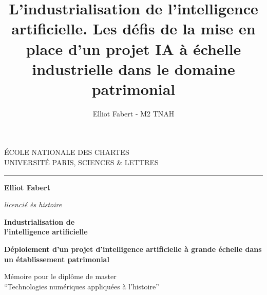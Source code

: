 \documentclass[a4paper,12pt,twoside]{book}
\author{Elliot Fabert - M2 TNAH}
\title{L'industrialisation de l'intelligence artificielle. Les défis de la mise en place d'un projet IA à échelle industrielle dans le domaine patrimonial}
\begin{document}
	\begin{titlepage}
		\begin{center}
			
			\bigskip
			
			\begin{large}				
				ÉCOLE NATIONALE DES CHARTES\\
				UNIVERSITÉ PARIS, SCIENCES \& LETTRES
			\end{large}
			\begin{center}\rule{2cm}{0.02cm}\end{center}
			
			\bigskip
			\bigskip
			\bigskip
			\begin{Large}
				\textbf{Elliot Fabert}\\
			\end{Large}
			\begin{normalsize} \textit{licencié ès histoire}\\
			\end{normalsize}
			
			\bigskip
			\bigskip
			\bigskip
			
			\begin{Huge}
				\textbf{Industrialisation de\\ l'intelligence artificielle}\\
			\end{Huge}
			\bigskip
			\bigskip
			\begin{LARGE}
				\textbf{Déploiement d’un projet d’intelligence artificielle à grande échelle dans un établissement patrimonial}\\
			\end{LARGE}
			
			\bigskip
			\bigskip
			\bigskip
			\begin{large}
			\end{large}
			\vfill
			
			\begin{large}
				Mémoire 
				pour le diplôme de master \\
				\enquote{Technologies numériques appliquées à l'histoire} \\
			\end{large}
			
		\end{center}
	\end{titlepage}

	\thispagestyle{empty}	
	\cleardoublepage
	
\frontmatter
\end{document}
